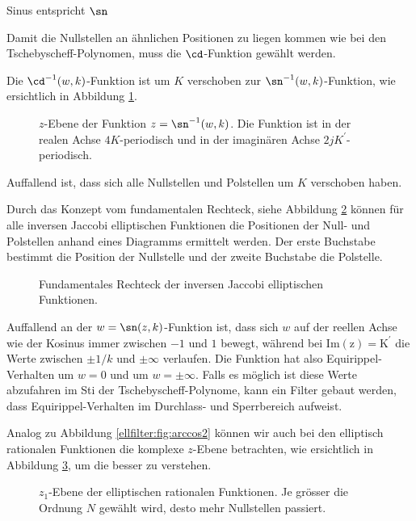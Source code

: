 \begin{refsection}
Sinus entspricht $\sn$

Damit die Nullstellen an ähnlichen Positionen zu liegen kommen wie bei den Tschebyscheff-Polynomen, muss die $\cd$-Funktion gewählt werden.

Die $\cd^{-1}(w, k)$-Funktion ist um $K$ verschoben zur $\sn^{-1}(w, k)$-Funktion, wie ersichtlich in Abbildung \ref{ellfilter:fig:cd}.
\begin{figure}
    \centering
    
    \caption{
        $z$-Ebene der Funktion $z = \sn^{-1}(w, k)$.
        Die Funktion ist in der realen Achse $4K$-periodisch und in der imaginären Achse $2jK^\prime$-periodisch.
    }
    \label{ellfilter:fig:cd}
\end{figure}
Auffallend ist, dass sich alle Nullstellen und Polstellen um $K$ verschoben haben.

Durch das Konzept vom fundamentalen Rechteck, siehe Abbildung \ref{ellfilter:fig:fundamental_rectangle} können für alle inversen Jaccobi elliptischen Funktionen die Positionen der Null- und Polstellen anhand eines Diagramms ermittelt werden.
Der erste Buchstabe bestimmt die Position der Nullstelle und der zweite Buchstabe die Polstelle.
\begin{figure}
    \centering
    
    \caption{
        Fundamentales Rechteck der inversen Jaccobi elliptischen Funktionen.
    }
    \label{ellfilter:fig:fundamental_rectangle}
\end{figure}

Auffallend an der $w = \sn(z, k)$-Funktion ist, dass sich $w$ auf der reellen Achse wie der Kosinus immer zwischen $-1$ und $1$ bewegt, während bei $\mathrm{Im(z) = K^\prime}$ die Werte zwischen $\pm 1/k$ und $\pm \infty$ verlaufen.
Die Funktion hat also Equirippel-Verhalten um $w=0$ und um $w=\pm \infty$.
Falls es möglich ist diese Werte abzufahren im Sti der Tschebyscheff-Polynome, kann ein Filter gebaut werden, dass Equirippel-Verhalten im Durchlass- und Sperrbereich aufweist.



Analog zu Abbildung \ref{ellfilter:fig:arccos2} können wir auch bei den elliptisch rationalen Funktionen die komplexe $z$-Ebene betrachten, wie ersichtlich in Abbildung \ref{ellfilter:fig:cd2}, um die besser zu verstehen.
\begin{figure}
    \centering
    
    \caption{
        $z_1$-Ebene der elliptischen rationalen Funktionen.
        Je grösser die Ordnung $N$ gewählt wird, desto mehr Nullstellen passiert.
    }
    \label{ellfilter:fig:cd2}
\end{figure}




\end{refsection}
